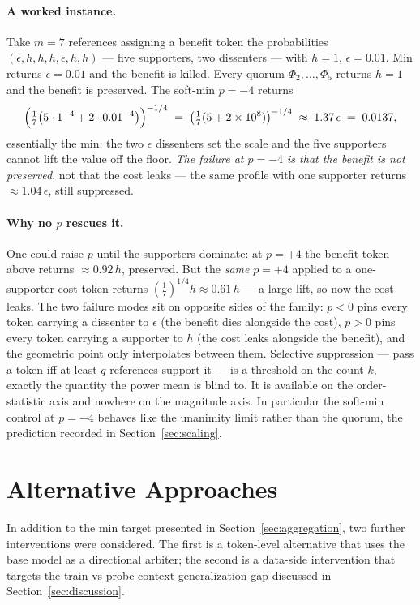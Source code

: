 \documentclass[11pt]{article}
\begin{document}
\paragraph{A worked instance.} Take $m = 7$ references assigning a benefit token the probabilities $(\epsilon, h, h, h, \epsilon, h, h)$ --- five supporters, two dissenters --- with $h = 1$, $\epsilon = 0.01$. Min returns $\epsilon = 0.01$ and the benefit is killed. Every quorum $\Phi_2, \dots, \Phi_5$ returns $h = 1$ and the benefit is preserved. The soft-min $p = -4$ returns
\[
\Bigl(\tfrac17\bigl(5\cdot 1^{-4} + 2\cdot 0.01^{-4}\bigr)\Bigr)^{-1/4} \;=\; \bigl(\tfrac17(5 + 2\times 10^{8})\bigr)^{-1/4} \;\approx\; 1.37\,\epsilon \;=\; 0.0137,
\]
essentially the min: the two $\epsilon$ dissenters set the scale and the five supporters cannot lift the value off the floor. \emph{The failure at $p = -4$ is that the benefit is not preserved}, not that the cost leaks --- the same profile with one supporter returns $\approx 1.04\,\epsilon$, still suppressed.

\paragraph{Why no $p$ rescues it.} One could raise $p$ until the supporters dominate: at $p = +4$ the benefit token above returns $\approx 0.92\,h$, preserved. But the \emph{same} $p = +4$ applied to a one-supporter cost token returns $(\tfrac17)^{1/4} h \approx 0.61\,h$ --- a large lift, so now the cost leaks. The two failure modes sit on opposite sides of the family: $p < 0$ pins every token carrying a dissenter to $\epsilon$ (the benefit dies alongside the cost), $p > 0$ pins every token carrying a supporter to $h$ (the cost leaks alongside the benefit), and the geometric point only interpolates between them. Selective suppression --- pass a token iff at least $q$ references support it --- is a threshold on the count $k$, exactly the quantity the power mean is blind to. It is available on the order-statistic axis and nowhere on the magnitude axis. In particular the soft-min control at $p = -4$ behaves like the unanimity limit rather than the quorum, the prediction recorded in Section~\ref{sec:scaling}.

\section{Alternative Approaches}
\label{app:alternatives}

In addition to the min target presented in Section~\ref{sec:aggregation}, two further interventions were considered. The first is a token-level alternative that uses the base model as a directional arbiter; the second is a data-side intervention that targets the train-vs-probe-context generalization gap discussed in Section~\ref{sec:discussion}.
\end{document}
